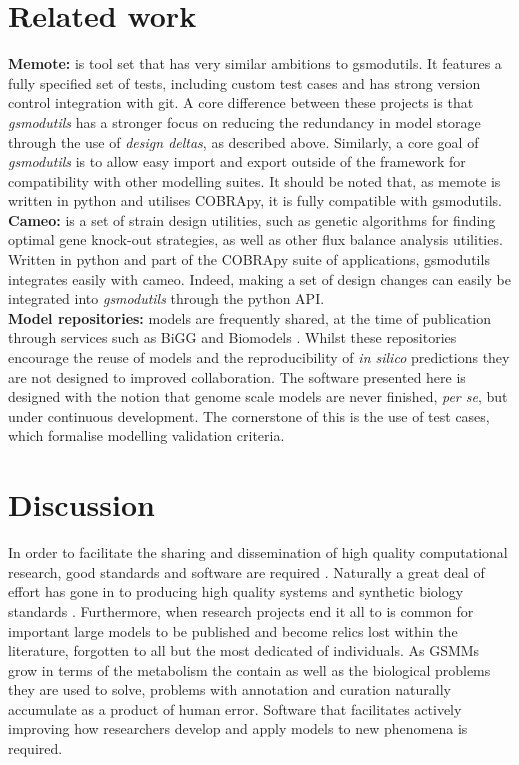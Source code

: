 \documentclass[journal=asbcd6,10pt]{achemso}
\begin{document}
\section{Related work}
\textbf{Memote:} \cite{lieven2017memote} is tool set that has very similar ambitions to gsmodutils.
It features a fully specified set of tests, including custom test cases and has strong version control integration with git.
A core difference between these projects is that \textit{gsmodutils} has a stronger focus on reducing the redundancy in model storage through the use of \textit{design deltas}, as described above.
Similarly, a core goal of \textit{gsmodutils} is to allow easy import and export outside of the framework for compatibility with other modelling suites.
It should be noted that, as memote is written in python and utilises COBRApy, it is fully compatible with gsmodutils.
\\
\textbf{Cameo:} \cite{cardoso2017cameo} is a set of strain design utilities, such as genetic algorithms for finding optimal gene knock-out
strategies, as well as other flux balance analysis utilities. Written in python and part of the COBRApy suite of applications,
gsmodutils integrates easily with cameo.
Indeed, making a set of design changes can easily be integrated into \textit{gsmodutils} through the python API.
\\
\textbf{Model repositories:} models are frequently shared, at the time of publication through services such as BiGG \cite{king2015bigg} and Biomodels \cite{chelliah2013biomodels}. 
Whilst these repositories encourage the reuse of models and the reproducibility of \textit{in silico} predictions they are not designed to improved collaboration.
The software presented here is designed with the notion that genome scale models are never finished, \textit{per se}, but under continuous development.
The cornerstone of this is the use of test cases, which formalise modelling validation criteria.


\section{Discussion}
In order to facilitate the sharing and dissemination of high quality computational research, good standards and software are required \cite{jimenez2017four}.
Naturally a great deal of effort has gone in to producing high quality systems and synthetic biology standards \cite{hucka2003systems, cox2018synthetic}.
Furthermore, when research projects end it all to is common for important large models to be published and become relics lost within the literature, forgotten to all but the most dedicated of individuals.
As GSMMs grow in terms of the metabolism the contain as well as the biological problems they are used to solve, problems with annotation and curation naturally accumulate as a product of human error.
Software that facilitates actively improving how researchers develop and apply models to new phenomena is required.
\end{document}
